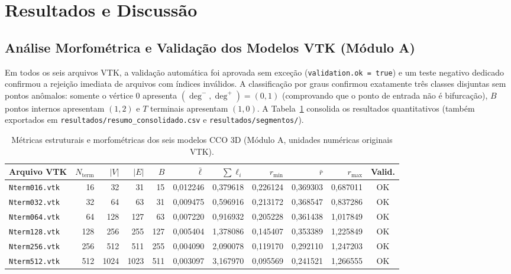 \documentclass[11pt, a4paper]{article}
\begin{document}
\section{Resultados e Discussão}

\subsection{Análise Morfométrica e Validação dos Modelos VTK (Módulo A)}

Em todos os seis arquivos VTK, a validação automática foi aprovada sem exceção (\texttt{validation.ok = true}) e um teste negativo dedicado confirmou a rejeição imediata de arquivos com índices inválidos. A classificação por graus confirmou exatamente três classes disjuntas sem pontos anômalos: somente o vértice $0$ apresenta $(\deg^-, \deg^+) = (0, 1)$ (comprovando que o ponto de entrada não é bifurcação), $B$ pontos internos apresentam $(1, 2)$ e $T$ terminais apresentam $(1, 0)$. A Tabela~\ref{tab:consolidada} consolida os resultados quantitativos (também exportados em \texttt{resultados/resumo\_consolidado.csv} e \texttt{resultados/segmentos/}).

\begin{table}[htbp]
  \centering
  \footnotesize
  \setlength{\tabcolsep}{4pt}
  \caption{Métricas estruturais e morfométricas dos seis modelos CCO 3D (Módulo A, unidades numéricas originais VTK).}
  \label{tab:consolidada}
  \begin{tabular}{lrrrrrrrrrc}
    \toprule
    \textbf{Arquivo VTK} & \textbf{$N_{\mathrm{term}}$} & \textbf{$|V|$} & \textbf{$|E|$} & \textbf{$B$} & \textbf{$\bar{\ell}$} & \textbf{$\sum \ell_i$} & \textbf{$r_{\min}$} & \textbf{$\bar{r}$} & \textbf{$r_{\max}$} & \textbf{Valid.} \\
    \midrule
    \texttt{Nterm016.vtk} & 16  & 32   & 31   & 15  & 0,012246 & 0,379618 & 0,226124 & 0,369303 & 0,687011 & OK \\
    \texttt{Nterm032.vtk} & 32  & 64   & 63   & 31  & 0,009475 & 0,596916 & 0,213172 & 0,368547 & 0,837286 & OK \\
    \texttt{Nterm064.vtk} & 64  & 128  & 127  & 63  & 0,007220 & 0,916932 & 0,205228 & 0,361438 & 1,017849 & OK \\
    \texttt{Nterm128.vtk} & 128 & 256  & 255  & 127 & 0,005404 & 1,378086 & 0,145407 & 0,353389 & 1,225849 & OK \\
    \texttt{Nterm256.vtk} & 256 & 512  & 511  & 255 & 0,004090 & 2,090078 & 0,119170 & 0,292110 & 1,247203 & OK \\
    \texttt{Nterm512.vtk} & 512 & 1024 & 1023 & 511 & 0,003097 & 3,167970 & 0,095569 & 0,241521 & 1,266555 & OK \\
    \bottomrule
  \end{tabular}
\end{table}
\end{document}
